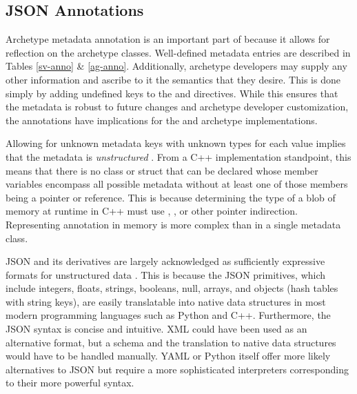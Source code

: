 \subsection{JSON Annotations}

Archetype metadata annotation is an important part of \cyclus because it allows for 
reflection on the archetype classes. Well-defined metadata entries are 
described in Tables \ref{sv-anno} \& \ref{ag-anno}. 
Additionally, archetype developers may supply 
any other information and ascribe to it the semantics that they desire.
This is done simply by adding undefined keys to the  and
 \cycpp directives.
While this ensures that the metadata is robust to future changes and archetype developer
customization, the annotations have implications for the \cyclus and archetype 
implementations.

Allowing for unknown metadata keys with unknown types for each value implies that 
the metadata is \emph{unstructured} \cite{feldman2007text}. From a C++ implementation 
standpoint, this means that there is no class or struct that can be declared whose
member variables encompass all possible metadata without at least one of those
members being a pointer or reference. This is because determining the type 
of a blob of memory at runtime in C++ must use , , 
or other pointer indirection. Representing annotation in memory is 
more complex than in a single metadata class.

\acrlong{JSON} and its derivatives are largely acknowledged as sufficiently expressive 
formats for unstructured data \cite{moniruzzaman2013nosql}. This is because the
\gls{JSON} primitives, which include integers, floats, strings, booleans, null, arrays, 
and objects (hash tables with string keys), are easily translatable into native
data structures in most modern programming languages such as Python and C++. 
Furthermore, the \gls{JSON} syntax is concise and intuitive. \gls{XML} could have been used 
as an alternative format, but a schema and the translation to native data structures 
would have to be handled manually. \gls{YAML} \cite{ben2009yaml} or Python itself offer 
more likely  alternatives to \gls{JSON} but require a more sophisticated interpreters 
corresponding to their more powerful syntax. 


